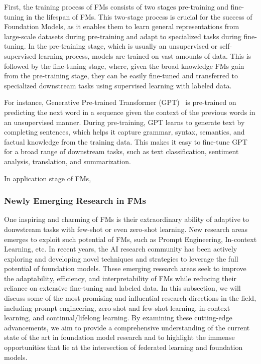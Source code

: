 First, the training process of FMs consists of two stages pre-training and fine-tuning in the lifespan of FMs. This two-stage process is crucial for the success of Foundation Models, as it enables them to learn general representations from large-scale datasets during pre-training and adapt to specialized tasks during fine-tuning. In the pre-training stage, which is usually an unsupervised or self-supervised learning process, models are trained on vast amounts of data. This is followed by the fine-tuning stage, where, given the broad knowledge FMs gain from the pre-training stage, they can be easily fine-tuned and transferred to specialized downstream tasks using supervised learning with labeled data.

For instance, Generative Pre-trained Transformer (GPT)~\cite{} is pre-trained on predicting the next word in a sequence given the context of the previous words in an unsupervised manner. During pre-training, GPT learns to generate text by completing sentences, which helps it capture grammar, syntax, semantics, and factual knowledge from the training data. This makes it easy to fine-tune GPT for a broad range of downstream tasks, such as text classification, sentiment analysis, translation, and summarization.



In application stage of FMs, 


\subsubsection{Newly Emerging Research in FMs}
One inspiring and charming of FMs is their extraordinary ability of adaptive to donwstream tasks with few-shot or even zero-shot learning. New research areas emerges to exploit such potential of FMs, such as Prompt Engineering, In-context Learning, etc.
In recent years, the AI research community has been actively exploring and developing novel techniques and strategies to leverage the full potential of foundation models. These emerging research areas seek to improve the adaptability, efficiency, and interpretability of FMs while reducing their reliance on extensive fine-tuning and labeled data. In this subsection, we will discuss some of the most promising and influential research directions in the field, including prompt engineering, zero-shot and few-shot learning, in-context learning, and continual/lifelong learning. By examining these cutting-edge advancements, we aim to provide a comprehensive understanding of the current state of the art in foundation model research and to highlight the immense opportunities that lie at the intersection of federated learning and foundation models.


